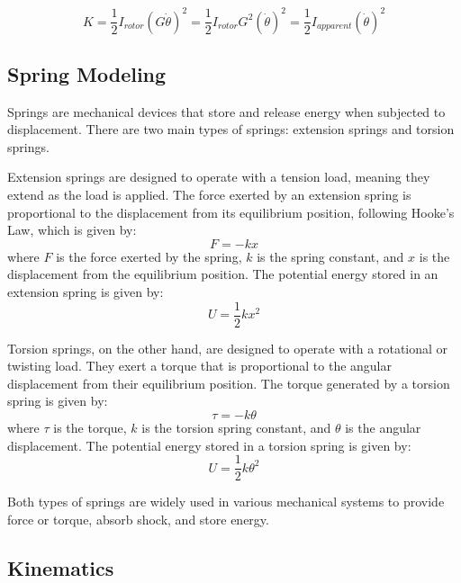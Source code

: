     \begin{equation}
        \label{eq:rotor_kinetic_energy}
        K = \frac{1}{2}{I}_{rotor}(G\dot\theta)^2 = \frac{1}{2}{I}_{rotor}G^2(\dot\theta)^2 = \frac{1}{2}I_{apparent}(\dot\theta)^2
    \end{equation}

\subsection{Spring Modeling}
\label{sec:spring_theory}
Springs are mechanical devices that store and release energy when subjected to displacement. There are two main types of springs: extension springs and torsion springs.

Extension springs are designed to operate with a tension load, meaning they extend as the load is applied. The force exerted by an extension spring is proportional to the displacement from its equilibrium position, following Hooke's Law, which is given by:
\begin{equation}
    F = -kx
\end{equation}
where \( F \) is the force exerted by the spring, \( k \) is the spring constant, and \( x \) is the displacement from the equilibrium position. The potential energy stored in an extension spring is given by:
\begin{equation}
    U = \frac{1}{2}kx^2
\end{equation}

Torsion springs, on the other hand, are designed to operate with a rotational or twisting load. They exert a torque that is proportional to the angular displacement from their equilibrium position. The torque generated by a torsion spring is given by:
\begin{equation}
    \tau = -k\theta
\end{equation}
where \( \tau \) is the torque, \( k \) is the torsion spring constant, and \( \theta \) is the angular displacement. The potential energy stored in a torsion spring is given by:
\begin{equation}
    U = \frac{1}{2}k\theta^2
\end{equation}

Both types of springs are widely used in various mechanical systems to provide force or torque, absorb shock, and store energy.

\subsection{Kinematics}
